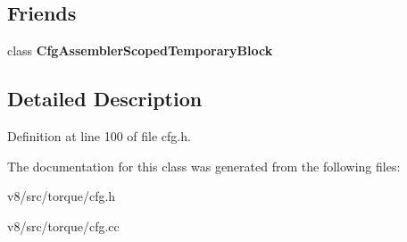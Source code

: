 \subsection*{Friends}
\begin{DoxyCompactItemize}
\item 
\mbox{\label{classv8_1_1internal_1_1torque_1_1CfgAssembler_a08842da5432d1a3b497da21ac7611c3b}} 
class {\bfseries Cfg\+Assembler\+Scoped\+Temporary\+Block}
\end{DoxyCompactItemize}


\subsection{Detailed Description}


Definition at line 100 of file cfg.\+h.



The documentation for this class was generated from the following files\+:\begin{DoxyCompactItemize}
\item 
v8/src/torque/cfg.\+h\item 
v8/src/torque/cfg.\+cc\end{DoxyCompactItemize}
